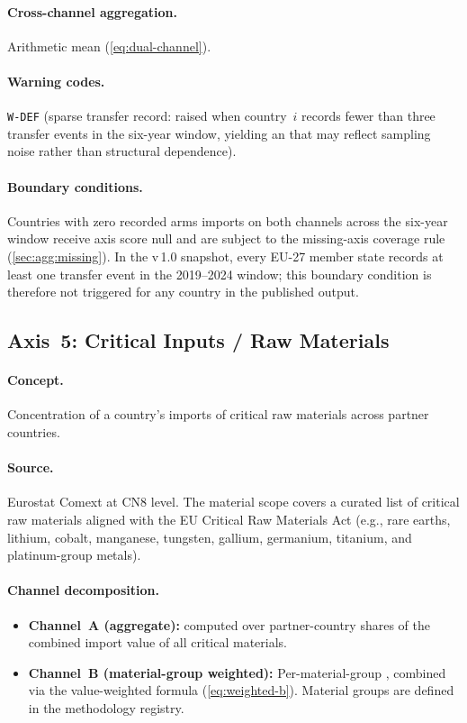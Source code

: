 \paragraph{Cross-channel aggregation.}
Arithmetic mean (\cref{eq:dual-channel}).

\paragraph{Warning codes.}
\texttt{W-DEF} (sparse transfer record: raised when country~\(i\) records
fewer than three transfer events in the six-year window, yielding an \HHI
that may reflect sampling noise rather than structural dependence).

\paragraph{Boundary conditions.}
Countries with zero recorded arms imports on both channels across the
six-year window receive axis score null and are subject to the
missing-axis coverage rule (\cref{sec:agg:missing}).  In the v\,1.0
snapshot, every EU-27 member state records at least one transfer event
in the 2019--2024 window; this boundary condition is therefore not
triggered for any country in the published output.

\subsection{Axis~5: Critical Inputs / Raw Materials}%
\label{sec:axis:critical-inputs}

\paragraph{Concept.}
Concentration of a country's imports of critical raw materials across
partner countries.

\paragraph{Source.}
Eurostat Comext at CN8 level.  The material scope covers a curated list
of critical raw materials aligned with the EU Critical Raw Materials Act
(e.g., rare earths, lithium, cobalt, manganese, tungsten, gallium,
germanium, titanium, and platinum-group metals).

\paragraph{Channel decomposition.}
\begin{itemize}
  \item \textbf{Channel~A (aggregate):}  \HHI computed over partner-country
    shares of the combined import value of all critical materials.
  \item \textbf{Channel~B (material-group weighted):}  Per-material-group
    \HHI, combined via the value-weighted formula (\cref{eq:weighted-b}).
    Material groups are defined in the methodology registry.
\end{itemize}

